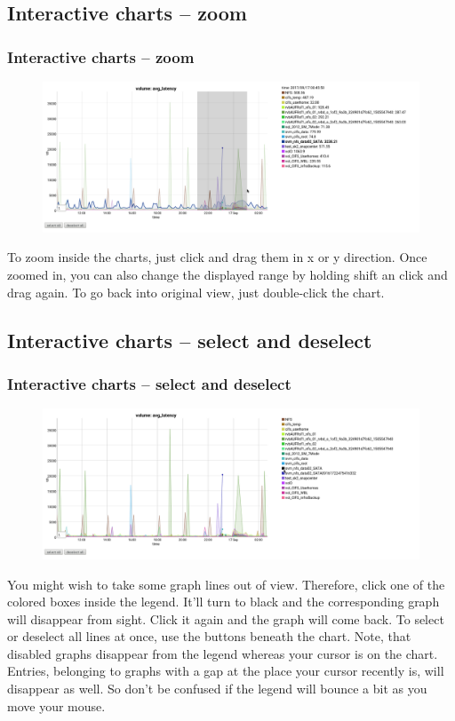 \documentclass[8pt]{beamer}
\begin{document}
\subsection{Interactive charts -- zoom}
\begin{frame}
\frametitle{Interactive charts -- zoom} 
\begin{figure}
	\includegraphics[width=\textwidth]{../images/PicDat_zoomVertical.png}
\end{figure}

To zoom inside the charts, just click and drag them in x or y direction. Once zoomed in, you can also change the displayed range by holding shift an click and drag again. To go back into original view, just double-click the chart.
\end{frame}

\subsection{Interactive charts -- select and deselect}
\begin{frame}
\frametitle{Interactive charts -- select and deselect} 
\begin{figure}
	\includegraphics[width=\textwidth]{../images/PicDat_deselect.png}
\end{figure}

You might wish to take some graph lines out of view. Therefore, click one of the colored boxes inside the legend. It'll turn to black and the corresponding graph will disappear from sight. Click it again and the graph will come back. To select or deselect all lines at once, use the buttons beneath the chart.
Note, that disabled graphs disappear from the legend whereas your cursor is on the chart. Entries, belonging to graphs with a gap at the place your cursor recently is, will disappear as well. So don't be confused if the legend will bounce a bit as you move your mouse.
\end{frame}
\end{document}
